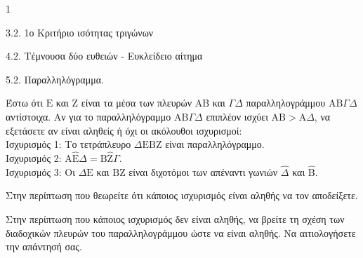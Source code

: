 \begin{ylh}{1}
    \item 3.2. 1ο Κριτήριο ισότητας τριγώνων
    \item 4.2. Τέμνουσα δύο ευθειών - Ευκλείδειο αίτημα
    \item 5.2. Παραλληλόγραμμα.
\end{ylh}
Έστω ότι $\mathrm{E}$ και $\mathrm{Z}$ είναι τα μέσα των πλευρών $\mathrm{A}\mathrm{B}$ και $\Gamma\Delta$ παραλληλογράμμου $\mathrm{A}\mathrm{B}\Gamma\Delta$ αντίστοιχα. Αν για το παραλληλόγραμμο $\mathrm{A}\mathrm{B}\Gamma\Delta$ επιπλέον ισχύει $\mathrm{A}\mathrm{B} > \mathrm{A}\Delta$, να εξετάσετε αν είναι αληθείς ή όχι οι ακόλουθοι ισχυρισμοί:\\[0.2cm]
Ισχυρισμός 1: Το τετράπλευρο $\Delta\mathrm{E}\mathrm{B}\mathrm{Z}$ είναι παραλληλόγραμμο. \\
Ισχυρισμός 2: $\mathrm{A}\hat{\mathrm{E}}\Delta = \mathrm{B}\hat{\mathrm{Z}}\Gamma$. \\
Ισχυρισμός 3: Οι $\Delta\mathrm{E}$ και $\mathrm{B}\mathrm{Z}$ είναι διχοτόμοι των απέναντι γωνιών $\hat{\Delta}$ και $\hat{\mathrm{B}}$.
\begin{alist}
    \item Στην περίπτωση που θεωρείτε ότι κάποιος ισχυρισμός είναι αληθής να τον αποδείξετε. 
    \item Στην περίπτωση που κάποιος ισχυρισμός δεν είναι αληθής, να βρείτε τη σχέση των διαδοχικών πλευρών του παραλληλογράμμου ώστε να είναι αληθής. Να αιτιολογήσετε την απάντησή σας. 
\end{alist}
